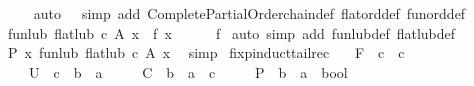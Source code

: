\begin{isabellebody}
\ \ \ \ \isamarkupfalse%
{\isacharparenleft}{\kern0pt}auto\ {}\ {}\ simp\ add{\isacharcolon}{\kern0pt}\ Complete{\isacharunderscore}{\kern0pt}Partial{\isacharunderscore}{\kern0pt}Order{\isachardot}{\kern0pt}chain{\isacharunderscore}{\kern0pt}def\ flat{\isacharunderscore}{\kern0pt}ord{\isacharunderscore}{\kern0pt}def\ fun{\isacharunderscore}{\kern0pt}ord{\isacharunderscore}{\kern0pt}def{\isacharparenright}{\kern0pt}\isanewline
\ \ \isamarkupfalse%
\ {\isachardoublequoteopen}fun{\isacharunderscore}{\kern0pt}lub\ {\isacharparenleft}{\kern0pt}flat{\isacharunderscore}{\kern0pt}lub\ c{\isacharparenright}{\kern0pt}\ A\ x\ {\isacharequal}{\kern0pt}\ f\ x{\isachardoublequoteclose}\isanewline
\ \ \ \ \isamarkupfalse%
\ f\ \isamarkupfalse%
{\isacharparenleft}{\kern0pt}auto\ simp\ add{\isacharcolon}{\kern0pt}\ fun{\isacharunderscore}{\kern0pt}lub{\isacharunderscore}{\kern0pt}def\ flat{\isacharunderscore}{\kern0pt}lub{\isacharunderscore}{\kern0pt}def{\isacharparenright}{\kern0pt}\isanewline
\ \ \isamarkupfalse%
\ \isamarkupfalse%
\ {\isachardoublequoteopen}P\ x\ {\isacharparenleft}{\kern0pt}fun{\isacharunderscore}{\kern0pt}lub\ {\isacharparenleft}{\kern0pt}flat{\isacharunderscore}{\kern0pt}lub\ c{\isacharparenright}{\kern0pt}\ A\ x{\isacharparenright}{\kern0pt}{\isachardoublequoteclose}\ \isamarkupfalse%
\ simp\isanewline
{}\isamarkupfalse%
%
\endisatagproof
{\isafoldproof}%
%
\isadelimproof
\isanewline
%
\endisadelimproof
\isanewline
{}\isamarkupfalse%
\ fixp{\isacharunderscore}{\kern0pt}induct{\isacharunderscore}{\kern0pt}tailrec{\isacharcolon}{\kern0pt}\isanewline
\ \ \ F\ {\isacharcolon}{\kern0pt}{\isacharcolon}{\kern0pt}\ {\isachardoublequoteopen}{\isacharprime}{\kern0pt}c\ {\isasymRightarrow}\ {\isacharprime}{\kern0pt}c{\isachardoublequoteclose}\ \isanewline
\ \ \ \ U\ {\isacharcolon}{\kern0pt}{\isacharcolon}{\kern0pt}\ {\isachardoublequoteopen}{\isacharprime}{\kern0pt}c\ {\isasymRightarrow}\ {\isacharprime}{\kern0pt}b\ {\isasymRightarrow}\ {\isacharprime}{\kern0pt}a{\isachardoublequoteclose}\ \isanewline
\ \ \ \ C\ {\isacharcolon}{\kern0pt}{\isacharcolon}{\kern0pt}\ {\isachardoublequoteopen}{\isacharparenleft}{\kern0pt}{\isacharprime}{\kern0pt}b\ {\isasymRightarrow}\ {\isacharprime}{\kern0pt}a{\isacharparenright}{\kern0pt}\ {\isasymRightarrow}\ {\isacharprime}{\kern0pt}c{\isachardoublequoteclose}\ \isanewline
\ \ \ \ P\ {\isacharcolon}{\kern0pt}{\isacharcolon}{\kern0pt}\ {\isachardoublequoteopen}{\isacharprime}{\kern0pt}b\ {\isasymRightarrow}\ {\isacharprime}{\kern0pt}a\ {\isasymRightarrow}\ bool{\isachardoublequoteclose}\ \isanewline

\end{isabellebody}
